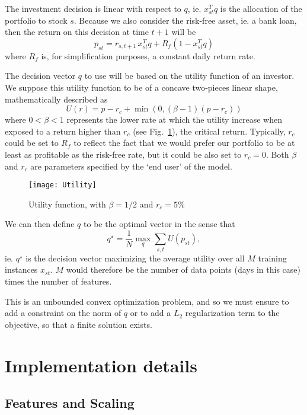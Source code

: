\documentclass[11pt,fleqn]{article}
\newcommand{\figref}[1]{Fig.~\ref{#1}}
\begin{document}
The investment decision is linear with respect to $q$, ie. $x_{st}^Tq$ is the allocation
of the portfolio to stock $s$. Because we also consider the risk-free asset, ie. a bank
loan, then the return on this decision at time $t+1$ will be
\begin{equation*}
  p_{st} = r_{s,t+1}\,x_{st}^Tq + R_f(1-x_{st}^Tq)
\end{equation*}
where $R_f$ is, for simplification purposes, a constant daily return rate. 

The decision vector $q$ to use will be based on the utility function of an investor. We
suppose this utility function to be of a concave two-pieces linear shape, mathematically
described as 
\begin{equation*}
  U(r) = p-r_c + \min(0,(\beta-1)(p-r_c))
\end{equation*}
where $0<\beta<1$ represents the lower rate at which the utility increase when exposed to
a return higher than $r_c$ (see \figref{fig:utility}), the critical return. Typically,
$r_c$ could be set to $R_f$ to reflect the fact that we would prefer our portfolio to be
at least as profitable as the risk-free rate, but it could be also set to $r_c=0$. Both
$\beta$ and $r_c$ are parameters specified by the `end user' of the model.

\begin{figure}
  \centering
  \texttt{[image: Utility]}
  \caption{Utility function, with $\beta=1/2$ and $r_c=5\%$}
  \label{fig:utility}
\end{figure}

We can then define $q$ to be the optimal vector in the sense that
\begin{equation*}
  q^\star = \frac{1}{N} \max_q \sum_{s,t} U(p_{st}),
\end{equation*}
ie. $q^\star$ is the decision vector maximizing the average utility over all $M$ training
instances $x_{st}$. $M$ would therefore be the number of data points (days in this case)
times the number of features.

This is an unbounded convex optimization problem, and so we must ensure to add a
constraint on the norm of $q$ or to add a $L_2$ regularization term to the objective, so
that a finite solution exists.

\section{Implementation details}

\subsection{Features and Scaling}
\end{document}
